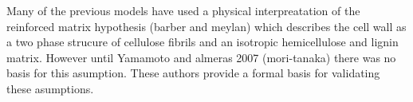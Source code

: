 Many of the previous models have used a physical interpreatation of the
reinforced matrix hypothesis (barber and meylan) which describes the cell wall
as a two phase strucure of cellulose fibrils and an isotropic hemicellulose and
lignin matrix. However until Yamamoto and almeras 2007 (mori-tanaka) there was
no basis for this asumption. These authors provide a formal basis for validating
these asumptions.